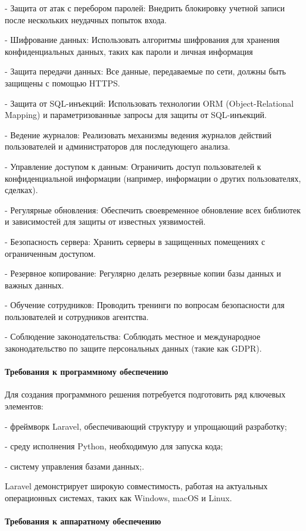 - Защита от атак с перебором паролей: Внедрить блокировку учетной записи после нескольких неудачных попыток входа.

- Шифрование данных: Использовать алгоритмы шифрования для хранения конфиденциальных данных, таких как пароли и личная информация 

- Защита передачи данных: Все данные, передаваемые по сети, должны быть защищены с помощью HTTPS.

- Защита от SQL-инъекций: Использовать технологии ORM (Object-Relational Mapping) и параметризованные запросы для защиты от SQL-инъекций.

- Ведение журналов: Реализовать механизмы ведения журналов действий пользователей и администраторов для последующего анализа.

- Управление доступом к данным: Ограничить доступ пользователей к конфиденциальной информации (например, информации о других пользователях, сделках).

- Регулярные обновления: Обеспечить своевременное обновление всех библиотек и зависимостей для защиты от известных уязвимостей.

- Безопасность сервера: Хранить серверы в защищенных помещениях с ограниченным доступом.

- Резервное копирование: Регулярно делать резервные копии базы данных и важных данных.

- Обучение сотрудников: Проводить тренинги по вопросам безопасности для пользователей и сотрудников агентства.

- Соблюдение законодательства: Соблюдать местное и международное законодательство по защите персональных данных (такие как GDPR).

\paragraph{Требования к программному обеспечению}

Для создания программного решения потребуется подготовить ряд ключевых элементов: 

- фреймворк Laravel, обеспечивающий структуру и упрощающий разработку; 

- среду исполнения Python, необходимую для запуска кода;

- систему управления базами данных;.

Laravel демонстрирует широкую совместимость, работая на актуальных операционных системах, таких как Windows, macOS и Linux.

\paragraph{Требования к аппаратному обеспечению}

